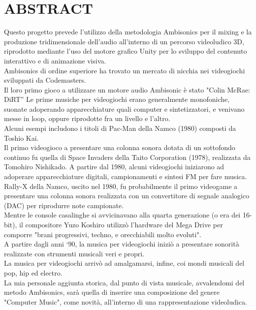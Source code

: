 
\chapter{ABSTRACT}
\label{chp:abstract}

Questo progetto prevede l'utilizzo della metodologia Ambisonics per il mixing e la produzione tridimensionale dell'audio all'interno di un percorso videoludico 3D, riprodotto mediante l'uso del motore grafico Unity per lo sviluppo del contenuto interattivo e di animazione visiva. \\
Ambisonics di ordine superiore ha trovato un mercato di nicchia nei videogiochi sviluppati da Codemasters. \\
 Il loro primo gioco a utilizzare un motore audio Ambisonic è stato "Colin McRae: DiRT”
Le prime musiche per videogiochi erano generalmente monofoniche, suonate adoperando apparecchiature quali computer e sintetizzatori, e venivano messe in loop, oppure riprodotte fra un livello e l'altro. \\
Alcuni esempi includono i titoli di Pac-Man della Namco (1980) composti da Toshio Kai. \\
 Il primo videogioco a presentare una colonna sonora dotata di un sottofondo continuo fu quella di Space Invaders della Taito Corporation (1978), realizzata da Tomohiro Nishikado. A partire dal 1980, alcuni videogiochi iniziarono ad adoperare apparecchiature digitali, campionamenti e sintesi FM per fare musica. \\
Rally-X della Namco, uscito nel 1980,
fu probabilmente il primo videogame a presentare una colonna sonora realizzata con un convertitore di segnale analogico (DAC) per riprodurre note campionate. \\
Mentre le console casalinghe si avvicinavano alla quarta generazione (o era dei 16-bit),
il compositore Yuzo Koshiro utilizzò l'hardware del Mega Drive per comporre "brani progressivi, techno, e orecchiabili molto evoluti". \\
A partire dagli anni `90, la musica per videogiochi iniziò a presentare sonorità realizzate con strumenti musicali veri e propri. \\
La musica per videogiochi arrivò ad amalgamarsi, infine, coi mondi musicali del pop, hip ed electro. \\
La mia personale aggiunta storica, dal punto di vista musicale, avvalendomi del metodo Ambisonics, sarà quella di inserire una composizione del genere "Computer Music", come novità, all'interno di una rappresentazione videoludica. \\

